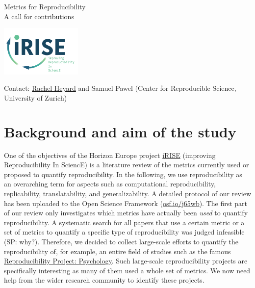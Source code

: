 \documentclass[a4paper,11pt]{report}
\begin{document}
\begin{minipage}{0.75\textwidth}
{\Huge \textcolor{iRISEblue}{Metrics for Reproducibility}}\\[.75ex]
{\Large \textcolor{iRISEblue}{A call for contributions}}\\[1ex]
\end{minipage}
\begin{minipage}{0.25\textwidth}
    \vspace{-1.25cm}
    \flushright
    \includegraphics[height=2.5cm]{../misc/iRISE-lightlogo.png}
\end{minipage}
{\footnotesize Contact: \href{mailto:rachel.heyard@uzh.ch}{Rachel Heyard} and Samuel Pawel (Center for Reproducible Science, University of Zurich)}

\section*{Background and aim of the study}
One of the objectives of the Horizon Europe project \href{https://irise-project.eu/}{iRISE} (improving Reproducibility In SciencE) is a literature review of the metrics currently used or proposed to quantify reproducibility. In the following, we use reproducibility as an overarching term for aspects such as computational reproducibility, replicability, translatability, and generalizability. A detailed protocol of our review has been uploaded to the Open Science Framework (\href{https://osf.io/j65wb}{osf.io/j65wb}). The first part of our review only investigates which metrics have actually been \emph{used} to quantify reproducibility. A systematic search for all papers that use a certain metric or a set of metrics to quantify a specific type of reproducibility was judged infeasible (SP: why?). Therefore, we decided to collect large-scale efforts to quantify the reproducibility of, for example, an entire field of studies such as the famous \href{https://doi.org/10.1126/science.aac4716}{Reproducibility Project: Psychology}. Such large-scale reproducibility projects are specifically interesting as many of them used a whole set of metrics. We now need help from the wider research community to identify these projects.
\end{document}
